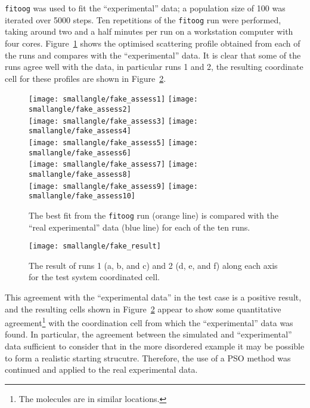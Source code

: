 \texttt{fitoog} was used to fit the ``experimental'' data; a population size of 100 was iterated over 5000 steps.
Ten repetitions of the \texttt{fitoog} run were performed, taking around two and a half minutes per run on a workstation computer with four cores.
Figure~\ref{fig:test_assess} shows the optimised scattering profile obtained from each of the runs and compares with the ``experimental'' data.
It is clear that some of the runs agree well with the data, in particular runs \num{1} and \num{2}, the resulting coordinate cell for these profiles are shown in Figure~\ref{fig:fake_result}.
%
\begin{figure}
    \centering
    \texttt{[image: smallangle/fake\_assess1]}
    \texttt{[image: smallangle/fake\_assess2]} \\
    \texttt{[image: smallangle/fake\_assess3]}
    \texttt{[image: smallangle/fake\_assess4]} \\
    \texttt{[image: smallangle/fake\_assess5]}
    \texttt{[image: smallangle/fake\_assess6]} \\
    \texttt{[image: smallangle/fake\_assess7]}
    \texttt{[image: smallangle/fake\_assess8]} \\
    \texttt{[image: smallangle/fake\_assess9]}
    \texttt{[image: smallangle/fake\_assess10]}
    \caption{The best fit from the \texttt{fitoog} run (orange line) is compared with the ``real experimental'' data (blue line) for each of the ten runs.}
    \label{fig:test_assess}
\end{figure}
%
%
\begin{figure}
    \centering
    \texttt{[image: smallangle/fake\_result]}
    \caption{The result of runs 1 (a, b, and c) and 2 (d, e, and f) along each axis for the test system coordinated cell.}
    \label{fig:fake_result}
\end{figure}
%

This agreement with the ``experimental data'' in the test case is a positive result, and the resulting cells shown in Figure~\ref{fig:fake_result} appear to show some quantitative agreement\footnote{The molecules are in similar locations.} with the coordination cell from which the ``experimental'' data was found.
In particular, the agreement between the simulated and ``experimental'' data sufficient to consider that in the more disordered example it may be possible to form a realistic starting strucutre. 
Therefore, the use of a PSO method was continued and applied to the real experimental data.

